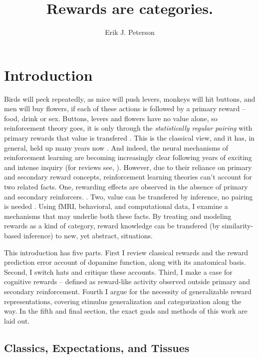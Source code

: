 \documentclass[doc,12pt]{apa}        %
\title{Rewards are categories.}
\author{Erik J. Peterson} \affiliation{Dept. of Psychology \\ Colorado State University \\ Fort Collins, CO}
\begin{document}
 
\maketitle
\doublespacing
\newpage
\tableofcontents
\newpage
\section{Introduction} %
\label{sec:introduction}
Birds will peck repeatedly, as mice will push levers, monkeys will hit buttons, and men will buy flowers, if each of these actions is followed by a primary reward -- food, drink or sex.  Buttons, levers and flowers have no value alone, so reinforcement theory goes, it is only through the \emph{statistically regular pairing} with primary rewards that value is transfered \cite{Rescorla:1988p8743}.  This is the classical view, and it has, in general, held up many years now \cite{iversen:2007aa}.  And indeed, the neural mechanisms of reinforcement learning are becoming increasingly clear following years of exciting and intense inquiry (for reviews see, ).  However, due to their reliance on primary and secondary reward concepts, reinforcement learning theories can't account for two related facts.  One, rewarding effects are observed in the absence of primary and secondary reinforcers.  \cite{Hayden:2009p6545, Lohrenz:2007p7240, Tricomi:2008p6663, Jimura:2010p8305}. Two, value can be transfered by inference, no pairing is needed \cite{BrombergMartin:2010p7223, Hampton:2006p2577}.  Using fMRI, behavioral, and computational data, I examine a mechanisms that may underlie both these facts.  By treating and modeling rewards as a kind of category, reward knowledge can be transfered (by similarity-based inference) to new, yet abstract, situations.

This introduction has five parts.  First I review classical rewards and the reward prediction error account of dopamine function, along with its anatomical basis.  Second, I switch hats and critique these accounts. Third, I make a case for cognitive rewards -- defined as reward-like activity observed outside primary and secondary reinforcement. Fourth I argue for the necessity of generalizable reward representations, covering stimulus generalization and categorization along the way.  In the fifth and final section, the exact goals and methods of this work are laid out.

\subsection{Classics, Expectations, and Tissues} %
\label{sub:cet}
\end{document}
